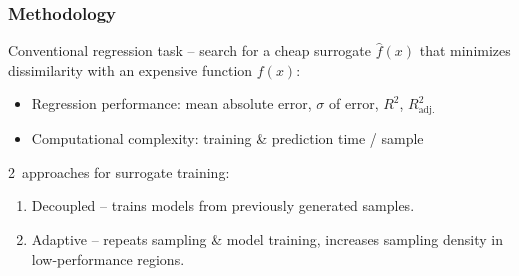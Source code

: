\begin{frame}
	\frametitle{Methodology}
		Conventional regression task -- search for a cheap surrogate $\hat{f}(x)$ that
		minimizes dissimilarity with an expensive function $f(x)$:

		\begin{itemize}
			\item
				Regression performance: mean absolute error, $\sigma$ of
				error, $R^2$, $R^2_\text{adj.}$
			\item
				Computational complexity:
				training \& prediction time / sample
		\end{itemize}

		\vspace{2em}

		2~approaches for surrogate training:
		\begin{enumerate}
			\item
				\alert{Decoupled} -- trains models from previously generated samples.
			\item
				\alert{Adaptive} -- repeats sampling \& model training, increases
				sampling density in low-performance regions.
		\end{enumerate}
\end{frame}

